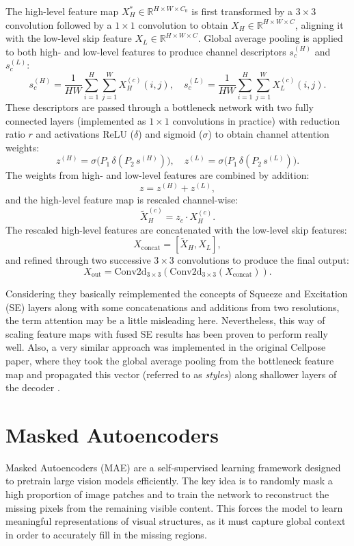 The high-level feature map $X_H^\ast \in \mathbb{R}^{H \times W \times C_0}$ is first transformed by a $3 \times 3$ convolution followed by a $1 \times 1$ convolution to obtain $X_H \in \mathbb{R}^{H \times W \times C}$, aligning it with the low-level skip feature $X_L \in \mathbb{R}^{H \times W \times C}$. Global average pooling is applied to both high- and low-level features to produce channel descriptors $s_c^{(H)}$ and $s_c^{(L)}$:
\[
s_c^{(H)} = \frac{1}{H W} \sum_{i=1}^{H} \sum_{j=1}^{W} X_H^{(c)}(i,j), \quad
s_c^{(L)} = \frac{1}{H W} \sum_{i=1}^{H} \sum_{j=1}^{W} X_L^{(c)}(i,j).
\]
These descriptors are passed through a bottleneck network with two fully connected layers (implemented as $1 \times 1$ convolutions in practice) with reduction ratio $r$ and activations ReLU ($\delta$) and sigmoid ($\sigma$) to obtain channel attention weights:
\[
z^{(H)} = \sigma \big( P_1 \, \delta(P_2 \, s^{(H)}) \big), \quad
z^{(L)} = \sigma \big( P_1 \, \delta(P_2 \, s^{(L)}) \big).
\]
The weights from high- and low-level features are combined by addition:
\[
z = z^{(H)} + z^{(L)},
\]
and the high-level feature map is rescaled channel-wise:
\[
\tilde{X}_H^{(c)} = z_c \cdot X_H^{(c)}.
\]
The rescaled high-level features are concatenated with the low-level skip features:
\[
X_{\text{concat}} = [\tilde{X}_H, X_L],
\]
and refined through two successive $3 \times 3$ convolutions to produce the final output:
\[
X_{\text{out}} = \text{Conv2d}_{3 \times 3}(\text{Conv2d}_{3 \times 3}(X_{\text{concat}})).
\]

Considering they basically reimplemented the concepts of Squeeze and Excitation (SE) \cite{hu2019squeezeandexcitationnetworks} layers along with some concatenations and additions from two resolutions, the term attention may be a little misleading here. Nevertheless, this way of scaling feature maps with fused SE results has been proven to perform really well. Also, a very similar approach was implemented in the original Cellpose paper, where they took the global average pooling from the bottleneck feature map and propagated this vector (referred to as \textit{styles}) along shallower layers of the decoder \cite{Stringer.2020}. 


\section{Masked Autoencoders}

Masked Autoencoders (MAE) \cite{he2021maskedautoencodersscalablevision} are a self-supervised learning framework designed to pretrain large vision models efficiently. The key idea is to randomly mask a high proportion of image patches and to train the network to reconstruct the missing pixels from the remaining visible content. This forces the model to learn meaningful representations of visual structures, as it must capture global context in order to accurately fill in the missing regions. 

